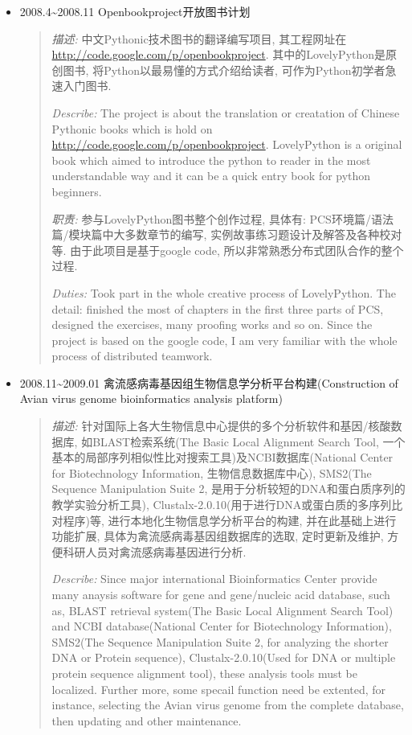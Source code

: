\documentclass[letterpaper,10pt,english]{manual}
\begin{document}
\begin{itemize}
\item {} 
2008.4\textasciitilde{}2008.11 Openbookproject开放图书计划
\begin{quote}

\emph{描述:} 中文Pythonic技术图书的翻译编写项目, 其工程网址在 \href{http://code.google.com/p/openbookproject/}{http://code.google.com/p/openbookproject}. 其中的LovelyPython是原创图书, 将Python以最易懂的方式介绍给读者, 可作为Python初学者急速入门图书.

\emph{Describe:} The project is about the translation or creatation of Chinese Pythonic books which is hold on \href{http://code.google.com/p/openbookproject/}{http://code.google.com/p/openbookproject}. LovelyPython is a original book which aimed to introduce the python to reader in the most understandable way and it can be a quick entry book for python beginners.

\emph{职责:} 参与LovelyPython图书整个创作过程, 具体有: PCS环境篇/语法篇/模块篇中大多数章节的编写, 实例故事练习题设计及解答及各种校对等. 由于此项目是基于google code, 所以非常熟悉分布式团队合作的整个过程.

\emph{Duties:} Took part in the whole creative process of LovelyPython. The detail: finished the most of chapters in the first three parts of PCS,  designed the exercises, many proofing works and so on. Since the project is based on the google code, I am very familiar with the whole process of distributed teamwork.
\end{quote}

\item {} 
2008.11\textasciitilde{}2009.01 禽流感病毒基因组生物信息学分析平台构建(Construction of Avian virus genome bioinformatics analysis platform)
\begin{quote}

\emph{描述:} 针对国际上各大生物信息中心提供的多个分析软件和基因/核酸数据库, 如BLAST检索系统(The Basic Local Alignment Search Tool, 一个基本的局部序列相似性比对搜索工具)及NCBI数据库(National Center for Biotechnology Information, 生物信息数据库中心), SMS2(The Sequence Manipulation Suite 2, 是用于分析较短的DNA和蛋白质序列的教学实验分析工具), Clustalx-2.0.10(用于进行DNA或蛋白质的多序列比对程序)等, 进行本地化生物信息学分析平台的构建, 并在此基础上进行功能扩展, 具体为禽流感病毒基因组数据库的选取, 定时更新及维护, 方便科研人员对禽流感病毒基因进行分析.

\emph{Describe:} Since major international Bioinformatics Center provide many anaysis software for gene and gene/nucleic acid database, such as, BLAST retrieval system(The Basic Local Alignment Search Tool) and NCBI database(National Center for Biotechnology Information), SMS2(The Sequence Manipulation Suite 2, for analyzing the shorter DNA or Protein sequence), Clustalx-2.0.10(Used for DNA or multiple protein sequence alignment tool), these analysis tools must be localized. Further more, some specail function need be extented, for instance, selecting the Avian virus genome from the complete database, then updating and other maintenance.


\end{quote}
\end{itemize}
\end{document}

